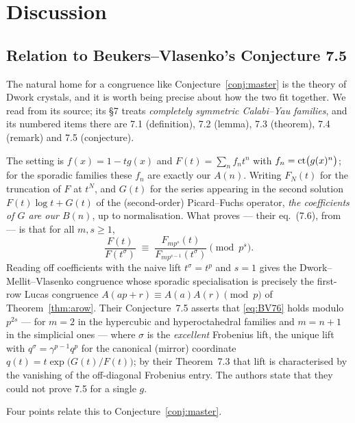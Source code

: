 \section{Discussion}
\label{sec:discussion}

\subsection{Relation to Beukers--Vlasenko's Conjecture 7.5}
\label{ssec:BV}

The natural home for a congruence like Conjecture~\ref{conj:master} is the theory of
Dwork crystals, and it is worth being precise about how the two fit together. We read
\cite{BVthree} from its source; its \S7 treats \emph{completely symmetric Calabi--Yau
families}, and its numbered items there are 7.1 (definition), 7.2 (lemma), 7.3 (theorem),
7.4 (remark) and 7.5 (conjecture).

The setting is $f(x)=1-tg(x)$ and $F(t)=\sum_nf_nt^n$ with $f_n=\operatorname{ct}\bigl(g(x)^n\bigr)$;
for the sporadic families these $f_n$ are exactly our $A(n)$. Writing $F_N(t)$ for the
truncation of $F$ at $t^N$, and $G(t)$ for the series appearing in the second solution
$F(t)\log t+G(t)$ of the (second-order) Picard--Fuchs operator, \emph{the coefficients of
$G$ are our $B(n)$}, up to normalisation. What \cite{BVthree} proves --- their eq.~(7.6),
from \cite[eq.~(7)]{BVtwo} --- is that for all $m,s\ge1$,
\begin{equation}\label{eq:BV76}
   \frac{F(t)}{F(t^\sigma)}\;\equiv\;\frac{F_{mp^s}(t)}{F_{mp^{s-1}}(t^\sigma)}\pmod{p^s}.
\end{equation}
Reading off coefficients with the naive lift $t^\sigma=t^p$ and $s=1$ gives the
Dwork--Mellit--Vlasenko congruence whose sporadic specialisation is precisely the
first-row Lucas congruence $A(ap+r)\equiv A(a)A(r)\pmod p$ of
Theorem~\ref{thm:arow}. Their Conjecture~7.5 asserts that \eqref{eq:BV76} holds modulo
$p^{2s}$ --- for $m=2$ in the hypercubic and hyperoctahedral families and $m=n+1$ in the
simplicial ones --- where $\sigma$ is the \emph{excellent} Frobenius lift, the unique lift
with $q^\sigma=\gamma^{p-1}q^p$ for the canonical (mirror) coordinate
$q(t)=t\exp\bigl(G(t)/F(t)\bigr)$; by their Theorem~7.3 that lift is characterised by the
vanishing of the off-diagonal Frobenius entry. The authors state that they could not prove
7.5 for a single $g$.

Four points relate this to Conjecture~\ref{conj:master}.

